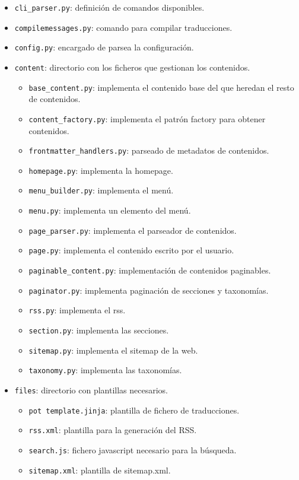 \begin{itemize}
\item \texttt{cli\_parser.py}: definición de comandos disponibles.
\item \texttt{compilemessages.py}: comando para compilar traducciones.
\item \texttt{config.py}: encargado de parsea la configuración.
\item \texttt{content}: directorio con los ficheros que gestionan los contenidos.
    \begin{itemize}
        \item \texttt{base\_content.py}: implementa el contenido base del que heredan el resto de contenidos.
       \item \texttt{content\_factory.py}: implementa el patrón factory para obtener contenidos.
       \item \texttt{frontmatter\_handlers.py}: parseado de metadatos de contenidos.
       \item \texttt{homepage.py}: implementa la homepage.
       \item \texttt{menu\_builder.py}: implementa el menú.
       \item \texttt{menu.py}: implementa un elemento del menú.
       \item \texttt{page\_parser.py}: implementa el parseador de contenidos.
       \item \texttt{page.py}: implementa el contenido escrito por el usuario.
       \item \texttt{paginable\_content.py}: implementación de contenidos paginables.
       \item \texttt{paginator.py}: implementa paginación de secciones y taxonomías.
       \item \texttt{rss.py}: implementa el rss.
       \item \texttt{section.py}: implementa las secciones.
       \item \texttt{sitemap.py}: implementa el sitemap de la web.
       \item \texttt{taxonomy.py}: implementa las taxonomías.
    \end{itemize}

\item \texttt{files}: directorio con plantillas necesarios.
    \begin{itemize}
        \item \texttt{pot template.jinja}: plantilla de fichero de traducciones.
       \item \texttt{rss.xml}: plantilla para la generación del RSS.
       \item \texttt{search.js}: fichero javascript necesario para la búsqueda.
       \item \texttt{sitemap.xml}: plantilla de sitemap.xml.
    \end{itemize}


\end{itemize}
